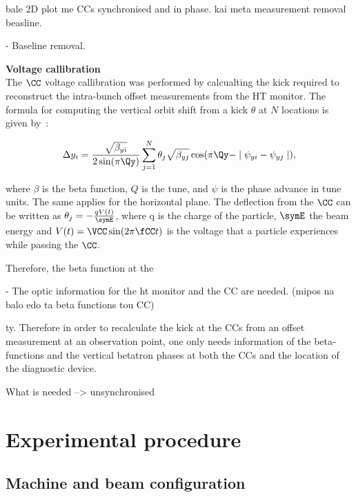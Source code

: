 bale 2D plot me CCs synchronised and in phase. 
kai meta measurement removal beasline.

- Baseline removal. 






\normalsize{\textbf{Voltage callibration}}\\
The $\CC$ voltage callibration was performed by calcualting the kick required to reconstruct the intra-bunch offset measurements from the HT monitor. The formula for computing the vertical orbit shift from a kick $\theta$ at $N$ locations is given by~\cite{Carver:2696108, Chao:1490001}:

\begin{equation}
   \Delta y_i  = \frac{\sqrt{\beta_{yi}}}{2 \sin(\pi \Qy)} \sum_{j=1}^{N} \theta_j \sqrt{\beta_{yj}} \cos(\pi \Qy - \mid \psi_{yi} - \psi_{yj} \mid),
\end{equation}

where $\beta$ is the beta function, $Q$ is the tune, and $\psi$ is the phase advance in tune units. The same applies for the horizontal plane. The deflection from the $\CC$ can be written as $\theta_j = - \frac{q V(t)}{\symE}$, where q is the charge of the particle, $\symE$ the beam energy and $V(t) = \VCC \sin(2 \pi \fCC t) $ is the voltage that a particle experiences while passing the $\CC$. 




Therefore, the beta function at the 


- The optic information for the ht monitor and the CC are needed.  (mipos na balo edo ta beta functions tou CC)

ty. Therefore in order
to recalculate the kick at the CCs from an offset measurement at an observation point, one only needs information of
the beta-functions and the vertical betatron phases at both
the CCs and the location of the diagnostic device.


\newpage



What is needed --> unsynchronised


\section{Experimental procedure}

\subsection{Machine and beam configuration}
